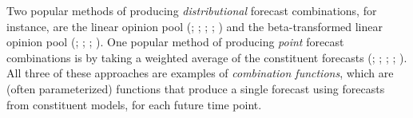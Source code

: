 \documentclass[12pt]{article}
\theoremstyle{definition}
\theoremstyle{remark}
\begin{document}
Two popular methods of producing \textit{distributional} forecast combinations, for instance, are the linear opinion pool (\citealp{Stone1961}; \citealp{Hall2007}; \citealp{Geweke2011}; \citealp{Opschoor2017}; \citealp{Martin2021}) and the beta-transformed linear opinion pool (\citealp{Ranjan2010}; \citealp{Gneiting2013}; \citealp{Satopaeae2014}; \citealp{Baran2018}). One popular method of producing \textit{point} forecast combinations is by taking a weighted average of the constituent forecasts (\citealp{Bates1969}; \citealp{Stock2004}; \citealp{Timmermann2006}; \citealp{Smith2009}; \citealp{Claeskens2016}). All three of these approaches are examples of \textit{combination functions}, which are (often parameterized) functions that produce a single forecast using forecasts from constituent models, for each future time point.
\end{document}
